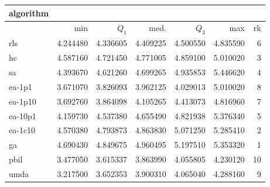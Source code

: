 \begin{tabular}{@{}l*{5}{>{{}}N{1}{2}}>{{}}N{2}{0}@{}}
\toprule
{algorithm} &  \\
\midrule
& {min} & {$Q_1$} & {med.} & {$Q_3$} & {max} & {rk}\\
\midrule
rls & 4.244480 & 4.336605 & 4.409225 & 4.500550 & 4.835590 & 6\\
hc & 4.587160 & 4.721450 & 4.771005 & 4.859100 & 5.010020 & 3\\
sa & 4.393670 & 4.621260 & 4.699265 & 4.935853 & {\color{blue}} 5.446620 & 4\\
ea-1p1 & 3.671070 & 3.826093 & 3.962125 & 4.029013 & 5.010020 & 8\\
ea-1p10 & 3.692760 & 3.864098 & 4.105265 & 4.413073 & 4.816960 & 7\\
ea-10p1 & 4.159730 & 4.537380 & 4.655490 & 4.821938 & 5.376340 & 5\\
ea-1c10 & 4.570380 & 4.793873 & 4.863830 & 5.071250 & 5.285410 & 2\\
ga & {\color{blue}} 4.690430 & {\color{blue}} 4.849675 & {\color{blue}} 4.960495 & {\color{blue}} 5.197510 & 5.353320 & 1\\
pbil & 3.477050 & 3.615337 & 3.863990 & 4.055805 & 4.230120 & 10\\
umda & 3.217500 & 3.652353 & 3.900310 & 4.065040 & 4.288160 & 9\\
\bottomrule
\end{tabular}
